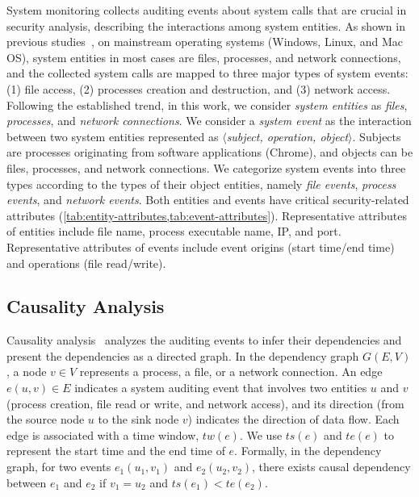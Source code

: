 System monitoring collects auditing events about system calls that are crucial in security analysis, describing the interactions among system entities.
As shown in previous studies~\cite{backtracking,backtracking2,taser,wormlog,gao2018saql,gao2018aiql,mcitracking,logtracking,liu2018priotracker,hassan2019nodoze}, on mainstream operating systems (Windows, Linux, and Mac OS), system entities in most cases are files, processes, and network connections,
and the collected system calls are mapped to three major types of system events:
(1) file access, 
(2) processes creation and destruction, and 
(3) network access. 
Following the established trend, in this work, we consider \emph{system entities} as \emph{files}, \emph{processes}, and \emph{network connections}. 
We consider a \emph{system event} as the interaction between two system entities represented as \emph{$\langle$subject, operation, object$\rangle$}. Subjects are processes originating from software applications (\eg Chrome), and objects can be files, processes, and network connections. 
We categorize system events into three types according to the types of their object entities, namely \emph{file events}, \emph{process events}, and \emph{network events}.
Both entities and events have critical security-related
attributes (\cref{tab:entity-attributes,tab:event-attributes}).
Representative attributes of entities include file name, process executable name, IP, and port.
Representative attributes of events include event origins (\eg start time/end time) and operations (\eg file read/write).

\subsection{Causality Analysis}
\label{subsec:causality-analysis}

Causality analysis~\cite{backtracking,backtracking2,taser,intrusionrecovery,liu2018priotracker,mcitracking,hassan2019nodoze,ma2016protracer} analyzes the auditing events to infer their dependencies 
and present the dependencies as a directed graph.
%
In the dependency graph $G(E,V)$, a node $v \in V$ represents a process, a file, or a network connection.
An edge $e(u, v) \in E$ indicates a system auditing event that involves two entities $u$ and $v$ (\eg process creation, file read or write, and network access), and its direction (from the source node $u$ to the sink node $v$) indicates the direction of data flow.
Each edge is associated with a time window, $tw(e)$.
We use $ts(e)$ and $te(e)$ to represent the start time and the end time of $e$.
Formally, in the dependency graph, for two events $e_1(u_1, v_1) $ and $e_2(u_2, v_2)$, there exists causal dependency between $e_1$ and $e_2$ if $v_1 = u_2$ and $ts(e_1) < te(e_2)$.

